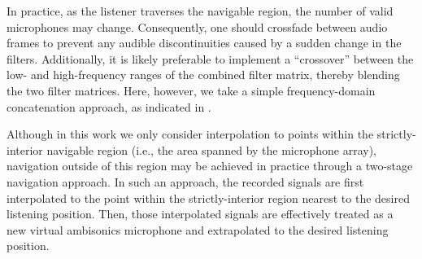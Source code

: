 In practice, as the listener traverses the navigable region, the number of valid microphones may change.
Consequently, one should crossfade between audio frames to prevent any audible discontinuities caused by a sudden change in the filters.
Additionally, it is likely preferable to implement a ``crossover'' between the low- and high-frequency ranges of the combined filter matrix, thereby blending the two filter matrices.
Here, however, we take a simple frequency-domain concatenation approach, as indicated in .


Although in this work we only consider interpolation to points within the strictly-interior navigable region (i.e., the area spanned by the microphone array), navigation outside of this region may be achieved in practice through a two-stage navigation approach.
In such an approach, the recorded signals are first interpolated to the point within the strictly-interior region nearest to the desired listening position.
Then, those interpolated signals are effectively treated as a new virtual ambisonics microphone and extrapolated to the desired listening position.